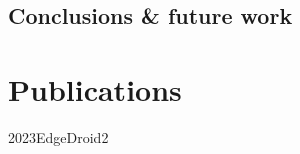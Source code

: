 \documentclass[electronic,oldfontcommands]{kthesis}
\begin{document}
\chapter{Conclusions \& future work}\label{chap:conclusions}


\renewcommand\chaptername{\newchaptername}
\renewcommand*{\thechapter}{\Alph{chapter}}
\part{Publications}\label{part:publications}






{2023EdgeDroid2}

\backmatter%
%
\printglossary[type=\acronymtype]%

\end{document}
